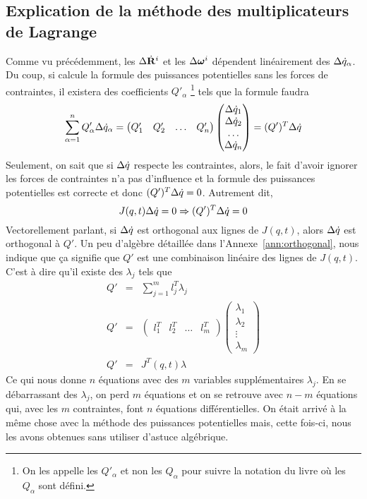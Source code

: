 \subsection{Explication de la méthode des multiplicateurs de Lagrange}
Comme vu précédemment, les $\Delta \dot{\bf R}^i$ et les $\Delta {\bm \omega}^i$ dépendent linéairement des $\Delta \dot{q}_\alpha$.
Du coup, si calcule la formule des puissances potentielles sans les forces de contraintes, il existera des coefficients $Q'_\alpha$
\footnote{On les appelle les $Q'_\alpha$ et non les $Q_\alpha$ pour suivre la notation du livre où les $Q_\alpha$ sont défini.}
tels que la formule faudra
\[ \sum_{\alpha = 1}^n Q'_\alpha \Delta \dot{q}_\alpha =
\begin{pmatrix}Q'_1 & Q'_2 & \ldots & Q'_n\end{pmatrix}\begin{pmatrix}\Delta \dot{q}_1\\\Delta \dot{q}_2\\\ldots\\\Delta \dot{q}_n\end{pmatrix}
= (Q')^T \Delta \dot{q} \]
Seulement, on sait que si $\Delta \dot{q}$ respecte les contraintes, alors, le fait d'avoir ignorer les forces de contraintes n'a pas d'influence et la formule des puissances potentielles est correcte et donc $(Q')^T \Delta \dot{q} = 0$.
Autrement dit,
\[ J(q, t) \Delta \dot{q} = 0 \Rightarrow (Q')^T \Delta \dot{q} = 0 \]
Vectorellement parlant, si $\Delta \dot{q}$ est orthogonal aux lignes de $J(q, t)$, alors $\Delta \dot{q}$ est orthogonal à $Q'$.
Un peu d'algèbre détaillée dans l'Annexe~\ref{ann:orthogonal}, nous indique que ça signifie que $Q'$ est une combinaison linéaire des lignes de $J(q, t)$.
C'est à dire qu'il existe des $\lambda_j$ tels que
\begin{eqnarray*}
	Q' &=& \sum_{j = 1}^m l_j^T \lambda_j\\
	Q' &=& \begin{pmatrix}l_1^T&l_2^T&\ldots&l_m^T\end{pmatrix} \begin{pmatrix}\lambda_1\\\lambda_2\\\vdots\\\lambda_m\end{pmatrix}\\
	Q' &=& J^T(q, t) \lambda
\end{eqnarray*}
Ce qui nous donne $n$ équations avec des $m$ variables supplémentaires $\lambda_j$.
En se débarrassant des $\lambda_j$, on perd $m$ équations et on se retrouve avec $n - m$ équations qui, avec les $m$ contraintes, font $n$ équations différentielles.
On était arrivé à la même chose avec la méthode des puissances potentielles mais, cette fois-ci, nous les avons obtenues sans utiliser d'astuce algébrique.

